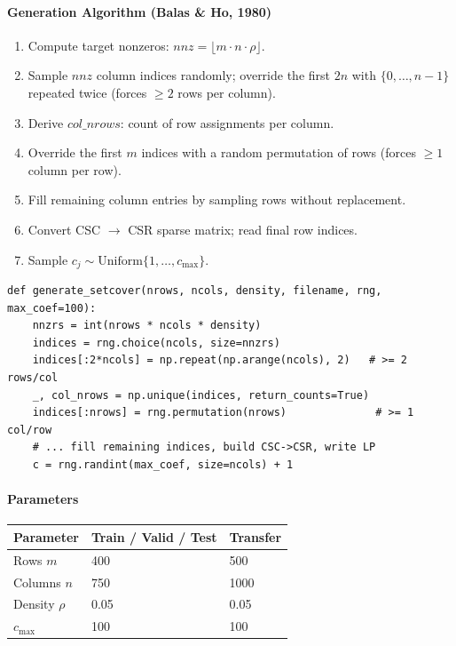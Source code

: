 \paragraph{Generation Algorithm (Balas \& Ho, 1980)}

\begin{enumerate}
    \item Compute target nonzeros: $\mathit{nnz} = \lfloor m \cdot n \cdot \rho \rfloor$.
    \item Sample $\mathit{nnz}$ column indices randomly; override the first $2n$ with $\{0,\ldots,n{-}1\}$ repeated twice (forces $\geq 2$ rows per column).
    \item Derive $\mathit{col\_nrows}$: count of row assignments per column.
    \item Override the first $m$ indices with a random permutation of rows (forces $\geq 1$ column per row).
    \item Fill remaining column entries by sampling rows without replacement.
    \item Convert CSC $\to$ CSR sparse matrix; read final row indices.
    \item Sample $c_j \sim \mathrm{Uniform}\{1,\ldots,c_{\max}\}$.
\end{enumerate}

\begin{lstlisting}
def generate_setcover(nrows, ncols, density, filename, rng, max_coef=100):
    nnzrs = int(nrows * ncols * density)
    indices = rng.choice(ncols, size=nnzrs)
    indices[:2*ncols] = np.repeat(np.arange(ncols), 2)   # >= 2 rows/col
    _, col_nrows = np.unique(indices, return_counts=True)
    indices[:nrows] = rng.permutation(nrows)              # >= 1 col/row
    # ... fill remaining indices, build CSC->CSR, write LP
    c = rng.randint(max_coef, size=ncols) + 1
\end{lstlisting}

\paragraph{Parameters}

\begin{tabular}{lll}
\toprule
Parameter & Train / Valid / Test & Transfer \\
\midrule
Rows $m$        & 400  & 500  \\
Columns $n$     & 750  & 1000 \\
Density $\rho$  & 0.05 & 0.05 \\
$c_{\max}$      & 100  & 100  \\
\bottomrule
\end{tabular}


